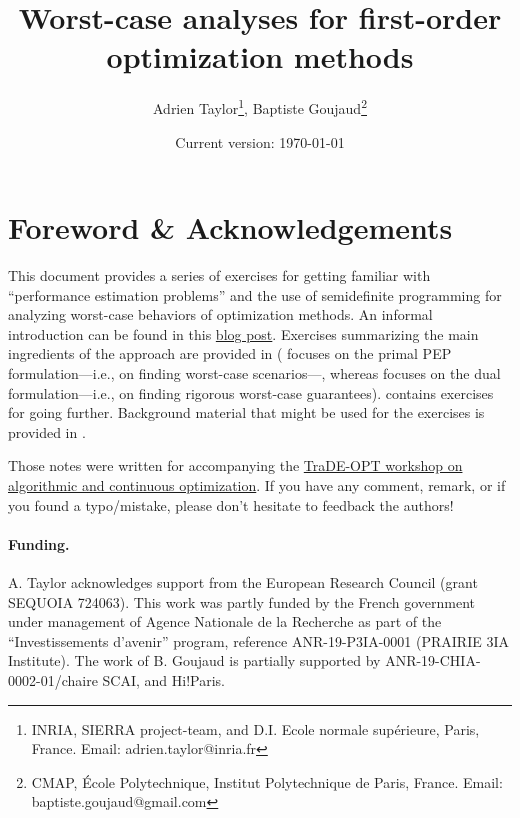 \documentclass[11pt,a4paper]{article}
\begin{document}
	\author{Adrien Taylor\footnote{INRIA, SIERRA project-team, and D.I. Ecole normale sup\'erieure, Paris, France. Email: adrien.taylor@inria.fr}, Baptiste Goujaud\footnote{CMAP, École Polytechnique, Institut Polytechnique de Paris, France. Email: baptiste.goujaud@gmail.com}}
	
	\title{Worst-case analyses for first-order optimization methods}
	\date{Current version: \today}
	\maketitle
	
	\renewcommand*\contentsname{}
	\setcounter{tocdepth}{2} \tableofcontents
	


	\section*{Foreword \& Acknowledgements}
	This document provides a series of exercises for getting familiar with ``performance estimation problems'' and the use of semidefinite programming for analyzing worst-case behaviors of optimization methods. An informal introduction can be found in this \href{https://francisbach.com/computer-aided-analyses/}{blog post}. Exercises summarizing the main ingredients of the approach are provided in  ( focuses on the primal PEP formulation---i.e., on finding worst-case scenarios---, whereas  focuses on the dual formulation---i.e., on finding rigorous worst-case guarantees).  contains exercises for going further. Background material that might be used for the exercises is provided in .
	
	Those notes were written for accompanying the \href{https://trade-opt-itn.eu/workshop.html}{TraDE-OPT workshop on algorithmic and continuous optimization}. If you have any comment, remark, or if you found a typo/mistake, please don't hesitate to feedback the authors!
	
	\paragraph*{Funding.} A. Taylor acknowledges support from the European Research Council (grant SEQUOIA 724063). This work was partly funded by the French government under management of Agence Nationale de la Recherche as part of the ``Investissements d’avenir'' program, reference ANR-19-P3IA-0001 (PRAIRIE 3IA Institute). The work of B. Goujaud is partially supported by ANR-19-CHIA-0002-01/chaire SCAI, and Hi!Paris. 
	
\end{document}
